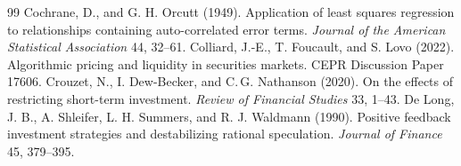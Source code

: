 \begin{thebibliography}{99}
 Cochrane, D., and G. H. Orcutt (1949). Application of least squares regression to relationships containing auto-correlated error terms. \emph{Journal of the American Statistical Association} 44, 32--61.
 Colliard, J.-E., T. Foucault, and S. Lovo (2022). Algorithmic pricing and liquidity in securities markets. CEPR Discussion Paper 17606.
 Crouzet, N., I. Dew-Becker, and C.\,G. Nathanson (2020). On the effects of restricting short-term investment. \emph{Review of Financial Studies} 33, 1--43.
 De Long, J. B., A. Shleifer, L. H. Summers, and R. J. Waldmann (1990). Positive feedback investment strategies and destabilizing rational speculation. \emph{Journal of Finance} 45, 379--395.


\end{thebibliography}
